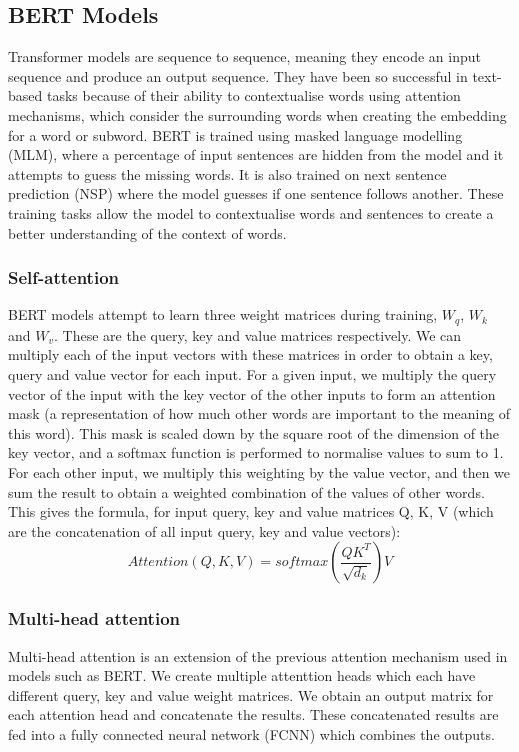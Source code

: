 \documentclass{l4proj}
\begin{document}
\subsection{BERT Models}
Transformer models are sequence to sequence, meaning they encode an input sequence and produce an output sequence. They have been so successful in text-based tasks because of their ability to contextualise words using attention mechanisms, which consider the surrounding words when creating the embedding for a word or subword. BERT is trained using masked language modelling (MLM), where a percentage of input sentences are hidden from the model and it attempts to guess the missing words. It is also trained on next sentence prediction (NSP) where the model guesses if one sentence follows another. These training tasks allow the model to contextualise words and sentences to create a better understanding of the context of words.
\subsubsection{Self-attention} \hfill \par
    BERT models attempt to learn three weight matrices during training, $W_q$, $W_k$ and $W_v$. These are the query, key and value matrices respectively. We can multiply each of the input vectors with these matrices in order to obtain a key, query and value vector for each input. For a given input, we multiply the query vector of the input with the key vector of the other inputs
    to form an attention mask (a representation of how much other words are important to the meaning of this word). This mask is scaled down by the square root of the dimension of the key vector, and a softmax function is performed to normalise values to sum to 1. For each other input, we multiply this weighting by the value vector, and then we sum the result to obtain a weighted combination of the values of other words. This gives the formula, for input query, key and value matrices Q, K, V (which are the concatenation of all input query, key and value vectors):
    $$Attention(Q, K, V) = softmax(\frac{QK^T}{\sqrt{d_k}})V$$
\subsubsection{Multi-head attention} \hfill \par
Multi-head attention is an extension of the previous attention mechanism used in models such as BERT. We create multiple attenttion heads which each have different query, key and value weight matrices. We obtain an output matrix for each attention head and concatenate the results. These concatenated results are fed into a fully connected neural network (FCNN) which combines the outputs.
\end{document}
